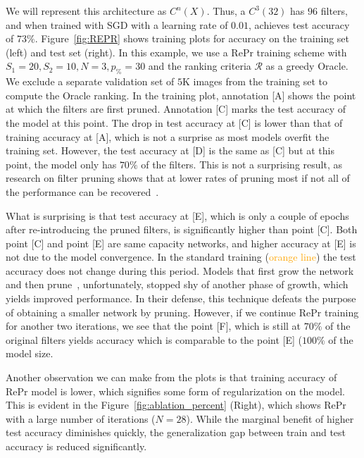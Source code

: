 We will represent this architecture as $C^n(X)$. Thus, a $C^3(32)$ has $96$ filters, and when trained with SGD with a learning rate of $0.01$, achieves test accuracy of $73\%$.
Figure~\ref{fig:REPR} shows training plots for accuracy on the training set (left) and test set (right). 
In this example, we use a RePr training scheme with $S_1=20, S_2=10, N=3, p_\%=30$ and the ranking criteria $\mathcal{R}$ as a greedy Oracle.
We exclude a separate validation set of $5$K images from the training set to compute the Oracle ranking.
In the training plot, annotation [A] shows the point at which the filters are first pruned.
Annotation [C] marks the test accuracy of the model at this point. 
The drop in test accuracy at [C] is lower than that of training accuracy at [A], which is not a surprise as most models overfit the training set.
However, the test accuracy at [D] is the same as [C] but at this point, the model only has $70\%$ of the filters. 
This is not a surprising result, as research on filter pruning shows that at lower rates of pruning most if not all of the performance can be recovered~\cite{Molchanov2016PruningCN}.

What is surprising is that test accuracy at [E], which is only a couple of epochs after re-introducing the pruned filters, is significantly higher than point [C].
Both point [C] and point [E] are same capacity networks, and higher accuracy at [E] is not due to the model convergence. 
In the standard training (\textcolor{orange}{orange line}) the test accuracy does not change during this period.
Models that first grow the network and then prune~\cite{Dai2017NeSTAN, Han2015LearningBW}, unfortunately, stopped shy of another phase of growth, which yields improved performance. 
In their defense, this technique defeats the purpose of obtaining a smaller network by pruning. 
However, if we continue RePr training for another two iterations, we see that the point [F], which is still at $70\%$ of the original filters yields accuracy which is comparable
to the point [E] ($100\%$ of the model size.

Another observation we can make from the plots is that training accuracy of RePr model is lower, which signifies some form of regularization on the model. 
This is evident in the Figure~\ref{fig:ablation_percent} (Right), which shows RePr with a large number of iterations ($N=28$). 
While the marginal benefit of higher test accuracy diminishes quickly, the generalization gap between train and test accuracy is reduced significantly.

